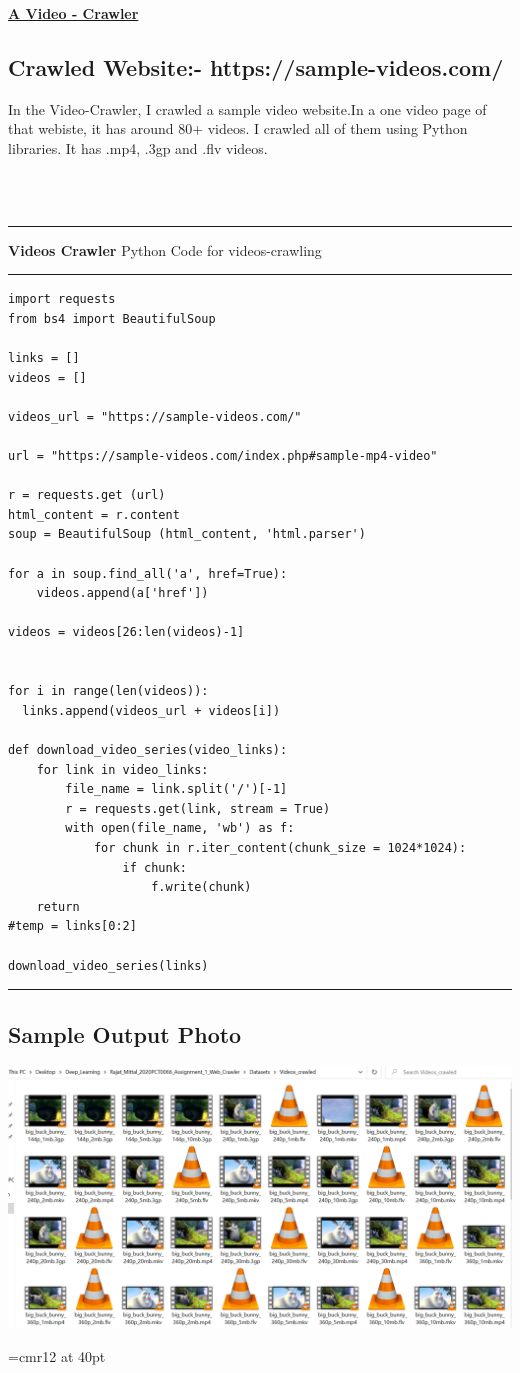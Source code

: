 \documentclass[11pt]{article}
\begin{document}
\centerline{\uline{\Large{\textbf{A Video - Crawler}}}}
\subsection*{Crawled Website:- https://sample-videos.com/}

\hspace{1in}In the Video-Crawler, I crawled a sample video website.In a one video page of that webiste, it has around 80+ videos. I crawled all of them using Python libraries. It has .mp4, .3gp and .flv videos.

\\

 \\
\rule{\textwidth}{0.4pt}
\textbf{Videos Crawler} Python Code for videos-crawling\\
\rule{\textwidth}{0.4pt}
\begin{lstlisting}
import requests
from bs4 import BeautifulSoup

links = []
videos = []

videos_url = "https://sample-videos.com/"

url = "https://sample-videos.com/index.php#sample-mp4-video"

r = requests.get (url)
html_content = r.content
soup = BeautifulSoup (html_content, 'html.parser')

for a in soup.find_all('a', href=True):
    videos.append(a['href'])

videos = videos[26:len(videos)-1]


for i in range(len(videos)):
  links.append(videos_url + videos[i])

def download_video_series(video_links):
	for link in video_links:
		file_name = link.split('/')[-1]
		r = requests.get(link, stream = True)
		with open(file_name, 'wb') as f:
			for chunk in r.iter_content(chunk_size = 1024*1024):
				if chunk:
					f.write(chunk)
	return
#temp = links[0:2]

download_video_series(links)

\end{lstlisting}
\rule{\textwidth}{0.4pt}

\subsection*{Sample Output Photo}
\includegraphics[scale=0.5]{images/Videos-crawled.PNG}

\pagebreak


\font\myfont=cmr12 at 40pt
\end{document}
